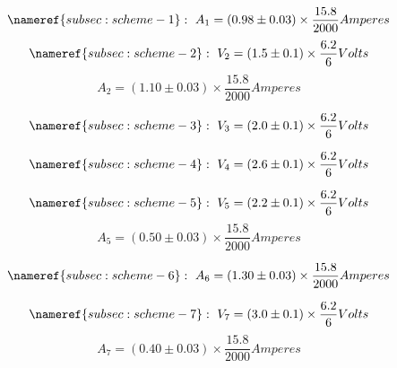 \documentclass[11pt]{memoir}
\newcommand{\initialCurrentDispersion}{0.03}
\newcommand{\initialVoltageDispersion}{0.1}
\newcommand{\voltageConvertingFrac}{\frac{6.2}{6}}
\newcommand{\currentConvertingFrac}{\frac{15.8}{2000}}
\begin{document}
    \begin{equation*}
        \nameref{subsec:scheme-1}: ~
        A_1 = \left( 0.98 \pm \initialCurrentDispersion \right) \times \currentConvertingFrac Amperes
    \end{equation*}
    \begin{equation*}
        \nameref{subsec:scheme-2}: ~
        V_2 = \left( 1.5 \pm \initialVoltageDispersion \right) \times \voltageConvertingFrac Volts
    \end{equation*}
    \begin{equation*}
        A_2 = \left( 1.10 \pm \initialCurrentDispersion \right) \times \currentConvertingFrac Amperes
    \end{equation*}

    \begin{equation*}
        \nameref{subsec:scheme-3}: ~
        V_3 = \left( 2.0 \pm \initialVoltageDispersion \right) \times \voltageConvertingFrac Volts
    \end{equation*}

    \begin{equation*}
        \nameref{subsec:scheme-4}: ~
        V_4 = \left( 2.6 \pm \initialVoltageDispersion \right) \times \voltageConvertingFrac Volts
    \end{equation*}

    \begin{equation*}
        \nameref{subsec:scheme-5}: ~
        V_5 = \left( 2.2 \pm \initialVoltageDispersion \right) \times \voltageConvertingFrac Volts
    \end{equation*}
    \begin{equation*}
        A_5 = \left( 0.50 \pm \initialCurrentDispersion \right) \times \currentConvertingFrac Amperes
    \end{equation*}

    \begin{equation*}
        \nameref{subsec:scheme-6}: ~
        A_6 = \left( 1.30 \pm \initialCurrentDispersion \right) \times \currentConvertingFrac Amperes
    \end{equation*}

    \begin{equation*}
        \nameref{subsec:scheme-7}: ~
        V_7 = \left( 3.0 \pm \initialVoltageDispersion \right) \times \voltageConvertingFrac Volts
    \end{equation*}
    \begin{equation*}
        A_7 = \left( 0.40 \pm \initialCurrentDispersion \right) \times \currentConvertingFrac Amperes
    \end{equation*}
\end{document}
